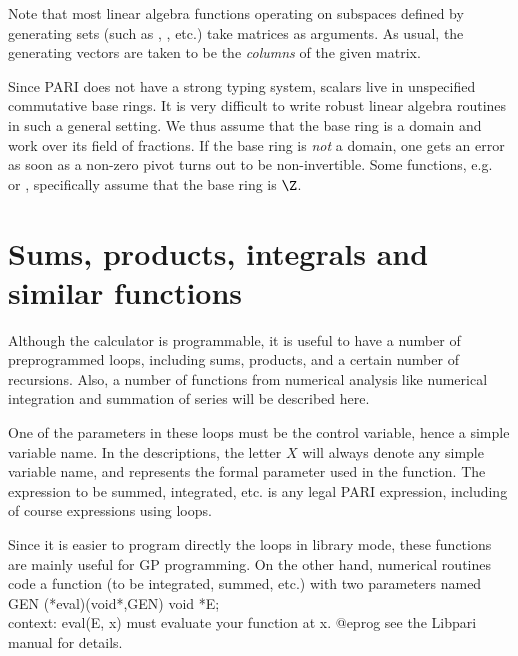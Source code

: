 Note that most linear algebra functions operating on subspaces defined by
generating sets (such as , , etc.) take matrices as
arguments. As usual, the generating vectors are taken to be the
\emph{columns} of the given matrix.

Since PARI does not have a strong typing system, scalars live in
unspecified commutative base rings. It is very difficult to write
robust linear algebra routines in such a general setting. We thus
assume that the base ring is a domain and work over its field of
fractions. If the base ring is \emph{not} a domain, one gets an error as soon
as a non-zero pivot turns out to be non-invertible. Some functions,
e.g.~ or , specifically assume that the base ring is
$\Z$.


\section{Sums, products, integrals and similar functions}
\label{se:sums}

Although the  calculator is programmable, it is useful to have
a number of preprogrammed loops, including sums, products, and a certain
number of recursions. Also, a number of functions from numerical analysis
like numerical integration and summation of series will be described here.

One of the parameters in these loops must be the control variable, hence a
simple variable name. In the descriptions, the letter $X$ will always denote
any simple variable name, and represents the formal parameter used in the
function. The expression to be summed, integrated, etc. is any legal PARI
expression, including of course expressions using loops.

Since it is easier to program directly the loops in library mode, these
functions are mainly useful for GP programming. On the other hand, numerical
routines code a function (to be integrated, summed, etc.) with two parameters
named
\bprog
  GEN (*eval)(void*,GEN)
  void *E;  \\ context: eval(E, x) must evaluate your function at x.
@eprog\noindent
see the Libpari manual for details.

